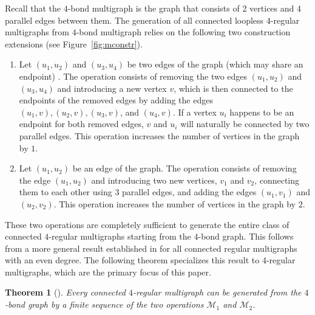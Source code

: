 \documentclass{article}
\newtheorem{theorem}{Theorem}
\begin{document}
        Recall that the $4$-bond multigraph is the graph that consists of 2 vertices and 4 parallel edges between them.
        The generation of all connected loopless $4$-regular multigraphs from $4$-bond multigraph relies on the following two construction extensions (see Figure~\ref{fig:mconstr}).
        
        \begin{enumerate}
            \item[$\mathcal{M}_1$:] Let $(u_1, u_2)$ and $(u_3, u_4)$ be two edges of the graph (which may share an endpoint) . 
            The operation consists of removing the two edges $(u_1, u_2)$ and $(u_3, u_4)$ and introducing a new vertex $v$, which is then connected to the endpoints of the removed edges by adding the edges $(u_1,v), (u_2,v), (u_3,v)$, and $(u_4,v)$.
            If a vertex $u_i$ happens to be an endpoint for both removed edges, $v$ and $u_i$ will naturally be connected by two parallel edges.
            This operation increases the number of vertices in the graph by $1$.
            
            \item[$\mathcal{M}_2$:] Let $(u_1, u_2)$ be an edge of the graph. 
            The operation consists of removing the edge $(u_1, u_2)$ and introducing two new vertices, $v_1$ and $v_2$, connecting them to each other using $3$ parallel edges, and adding the edges $(u_1, v_1)$ and $(u_2, v_2)$. 
            This operation increases the number of vertices in the graph by $2$.
        \end{enumerate}
        
            These two operations are completely sufficient to generate the entire class of connected $4$-regular multigraphs starting from the $4$-bond graph. 
            This follows from a more general result established in \cite{DING2003329} for all connected regular multigraphs with an even degree. 
            The following theorem specializes this result to $4$-regular multigraphs, which are the primary focus of this paper.
        
        \begin{theorem}[\cite{DING2003329}]
            Every connected $4$-regular multigraph can be generated from the $4$-bond graph by a finite sequence of the two operations $\mathcal{M}_1$ and $\mathcal{M}_2$.
        \end{theorem}
    
\end{document}

